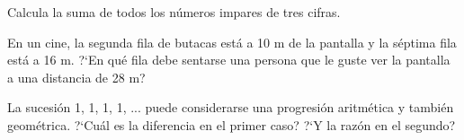 \vspace{-8mm}
\begin{flushright}
\begin{footnotesize} \textcolor{gris}{}	\end{footnotesize}
\end{flushright}



\begin{mipropuesto}

Calcula la suma de todos los números impares de tres cifras.
\end{mipropuesto}

\vspace{-8mm}
\begin{flushright}
\begin{footnotesize} \textcolor{gris}{}	\end{footnotesize}
\end{flushright}



\begin{mipropuesto}

En un cine, la segunda fila de butacas está a 10 m de la pantalla y la séptima fila está a 16 m. ?`En qué fila debe sentarse una persona que le guste ver la pantalla a una distancia de 28 m?
\end{mipropuesto}

\vspace{-8mm}
\begin{flushright}
\begin{footnotesize} \textcolor{gris}{}	\end{footnotesize}
\end{flushright}



\begin{mipropuesto}

La sucesión 1, 1, 1, 1, ... puede considerarse una progresión aritmética y también geométrica. ?`Cuál es la diferencia en el primer caso? ?`Y la razón en el segundo?

\end{mipropuesto}

\vspace{-8mm}
\begin{flushright}
\begin{footnotesize} \textcolor{gris}{}	\end{footnotesize}
\end{flushright}



